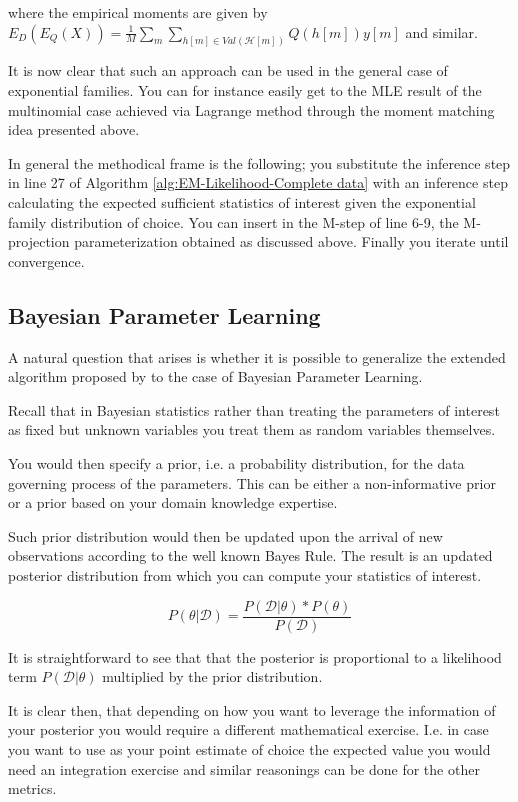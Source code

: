 \documentclass[11pt]{article}
\begin{document}
\begin{article}
where the empirical moments are given by \(E_D(E_Q(X)) = \frac{1}{M}
   \sum_m \sum_{h[m] \in Val(\mathscr{H}[m])} Q(h[m]) y[m]\) and
similar.    

It is now clear that such an approach can be used in the general
case of exponential families. You can for instance easily get to
the MLE result of the multinomial case achieved via Lagrange method
through the moment matching idea presented above.

In general the methodical frame is the following; you substitute
the inference step in line 27 of Algorithm
\ref{alg:EM-Likelihood-Complete data} with an inference step
calculating the expected sufficient statistics of interest given
the exponential family distribution of choice. You can insert in
the M-step of line 6-9, the M-projection parameterization obtained
as discussed above. Finally you iterate until convergence.

\subsection{Bayesian Parameter Learning}
\label{bayes-parameter-learning}
A natural question that arises is whether it is possible to
generalize the extended algorithm proposed by \cite{Mrad_2015} to the
case of Bayesian Parameter Learning.

Recall that in Bayesian statistics rather than treating the
parameters of interest as fixed but unknown variables you treat
them as random variables themselves.

You would then specify a prior, i.e. a probability distribution, for
the data governing process of the parameters. This can be either a
non-informative prior or a prior based on your domain knowledge
expertise.

Such prior distribution would then be updated upon the arrival of
new observations according to the well known Bayes Rule. The result
is an updated posterior distribution from which you can compute your
statistics of interest.


\begin{equation} \label{eq:bayes_formula}
P (\theta | \mathscr{D}) = \frac{P (\mathscr{D} | \theta) * P(\theta)}{P (\mathscr{D})} 
\end{equation}

It is straightforward to see that that the posterior is proportional
to a likelihood term \(P (\mathscr{D} | \theta)\) multiplied by the
prior distribution.

It is clear then, that depending on how you want to leverage the
information of your posterior you would require a different
mathematical exercise. I.e. in case you want to use as your
point estimate of choice the expected value you would need an
integration exercise and similar reasonings can be done for the
other metrics.


\end{article}
\end{document}
